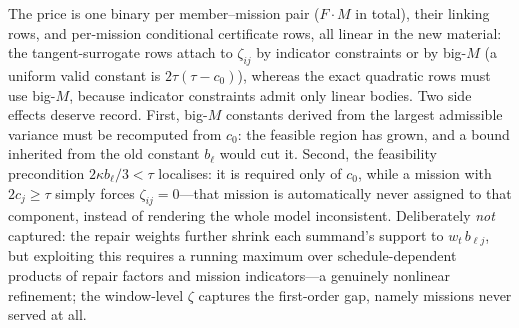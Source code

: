 \documentclass[11pt,a4paper]{article}
\theoremstyle{plain}
\theoremstyle{definition}
\theoremstyle{remark}
\begin{document}
The price is one binary per member--mission pair ($F \cdot M$ in total), their linking rows, and per-mission conditional certificate rows, all linear in the new material: the tangent-surrogate rows attach to $\zeta_{ij}$ by indicator constraints or by big-$M$ (a uniform valid constant is $2\tau(\tau - c_0)$), whereas the exact quadratic rows must use big-$M$, because indicator constraints admit only linear bodies.
Two side effects deserve record.
First, big-$M$ constants derived from the largest admissible variance must be recomputed from $c_0$: the feasible region has grown, and a bound inherited from the old constant $b_\ell$ would cut it.
Second, the feasibility precondition $2\kappa b_\ell/3 < \tau$ localises: it is required only of $c_0$, while a mission with $2c_j \ge \tau$ simply forces $\zeta_{ij} = 0$---that mission is automatically never assigned to that component, instead of rendering the whole model inconsistent.
Deliberately \emph{not} captured: the repair weights further shrink each summand's support to $w_t\,b_{\ell j}$, but exploiting this requires a running maximum over schedule-dependent products of repair factors and mission indicators---a genuinely nonlinear refinement; the window-level $\zeta$ captures the first-order gap, namely missions never served at all.
\end{document}
